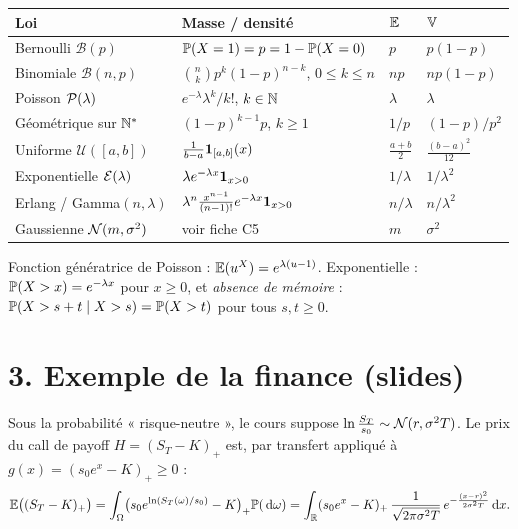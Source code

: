 \documentclass[11pt,a4paper]{article}
\begin{document}
\begin{horscours}\label{C2:lois}
\small
\renewcommand{\arraystretch}{1.25}\leavevmode\par\noindent
\begin{tabularx}{\linewidth}{@{}lXll@{}}
\toprule
Loi & Masse / densité & $\mathbb{E}$ & $\operatorname{\mathbb{V}}$\\\midrule
Bernoulli $\mathcal B(p)$ & $\mathbb{P}(X=1)=p=1-\mathbb{P}(X=0)$ & $p$ & $p(1-p)$\\
Binomiale $\mathcal B(n,p)$ & $\binom nk p^k(1-p)^{n-k}$, $0\le k\le n$ & $np$ & $np(1-p)$\\
Poisson $\mathcal{P}(\lambda)$ & $e^{-\lambda}\lambda^k/k!$, $k\in\mathbb{N}$ & $\lambda$ & $\lambda$\\
Géométrique sur $\mathbb{N}^*$ & $(1-p)^{k-1}p$, $k\ge1$ & $1/p$ & $(1-p)/p^2$\\
Uniforme $\mathcal U([a,b])$ & $\frac1{b-a}\mathbf{1}_{[a,b]}(x)$ & $\frac{a+b}2$ & $\frac{(b-a)^2}{12}$\\
Exponentielle $\mathcal{E}(\lambda)$ & $\lambda e^{-\lambda x}\mathbf{1}_{x>0}$ & $1/\lambda$ & $1/\lambda^2$\\
Erlang / Gamma$(n,\lambda)$ & $\lambda^n\frac{x^{n-1}}{(n-1)!}e^{-\lambda x}\mathbf{1}_{x>0}$ & $n/\lambda$ & $n/\lambda^2$\\
Gaussienne $\mathcal{N}(m,\sigma^2)$ & voir fiche C5 & $m$ & $\sigma^2$\\\bottomrule
\end{tabularx}

Fonction génératrice de Poisson : $\mathbb{E}(u^X)=e^{\lambda(u-1)}$. Exponentielle : $\mathbb{P}(X>x)=e^{-\lambda x}$ pour $x\ge0$, et
\emph{absence de mémoire} : $\mathbb{P}(X>s+t\mid X>s)=\mathbb{P}(X>t)$ pour tous $s,t\ge0$.
\end{horscours}

\section*{3. Exemple de la finance (slides)}

Sous la probabilité « risque-neutre », le cours suppose $\ln\frac{S_T}{s_0}\sim\mathcal{N}(r,\sigma^2T)$.
Le prix du call de payoff $H=(S_T-K)_+$ est, par transfert appliqué à $g(x)=(s_0e^x-K)_+\ge0$ :
\[\mathbb{E}\bigl((S_T-K)_+\bigr)=\int_\Omega\bigl(s_0e^{\ln(S_T(\omega)/s_0)}-K\bigr)_+\mathbb{P}(\,\mathrm{d}\omega)
=\int_{\mathbb{R}} (s_0e^x-K)_+\,\frac{1}{\sqrt{2\pi\sigma^2T}}\,e^{-\frac{(x-r)^2}{2\sigma^2T}}\,\mathrm{d} x.\]
\end{document}
